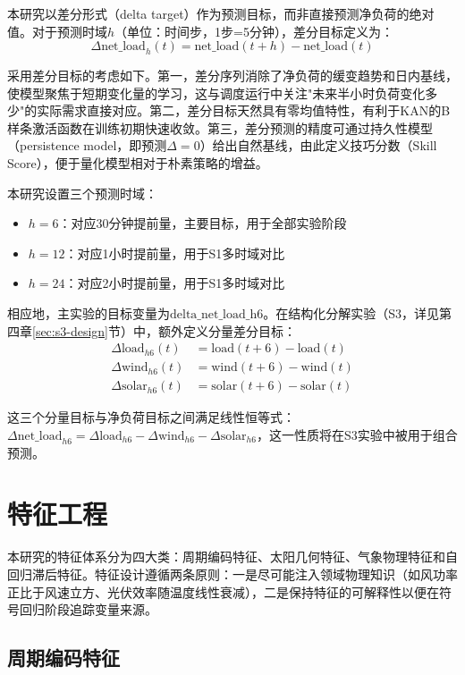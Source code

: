 本研究以差分形式（delta target）作为预测目标，而非直接预测净负荷的绝对值。对于预测时域$h$（单位：时间步，1步=5分钟），差分目标定义为：
\begin{equation}
\Delta\text{net\_load}_{h}(t) = \text{net\_load}(t+h) - \text{net\_load}(t)
\end{equation}

采用差分目标的考虑如下。第一，差分序列消除了净负荷的缓变趋势和日内基线，使模型聚焦于短期变化量的学习，这与调度运行中关注"未来半小时负荷变化多少"的实际需求直接对应。第二，差分目标天然具有零均值特性，有利于KAN的B样条激活函数在训练初期快速收敛。第三，差分预测的精度可通过持久性模型（persistence model，即预测$\Delta = 0$）给出自然基线，由此定义技巧分数（Skill Score），便于量化模型相对于朴素策略的增益。

本研究设置三个预测时域：
\begin{itemize}
  \item $h=6$：对应30分钟提前量，主要目标，用于全部实验阶段
  \item $h=12$：对应1小时提前量，用于S1多时域对比
  \item $h=24$：对应2小时提前量，用于S1多时域对比
\end{itemize}

相应地，主实验的目标变量为$\text{delta\_net\_load\_h6}$。在结构化分解实验（S3，详见第四章\ref{sec:s3-design}节）中，额外定义分量差分目标：
\begin{align}
\Delta\text{load}_{h6}(t) &= \text{load}(t+6) - \text{load}(t) \\
\Delta\text{wind}_{h6}(t) &= \text{wind}(t+6) - \text{wind}(t) \\
\Delta\text{solar}_{h6}(t) &= \text{solar}(t+6) - \text{solar}(t)
\end{align}

这三个分量目标与净负荷目标之间满足线性恒等式：$\Delta\text{net\_load}_{h6} = \Delta\text{load}_{h6} - \Delta\text{wind}_{h6} - \Delta\text{solar}_{h6}$，这一性质将在S3实验中被用于组合预测。

\section{特征工程}

本研究的特征体系分为四大类：周期编码特征、太阳几何特征、气象物理特征和自回归滞后特征。特征设计遵循两条原则：一是尽可能注入领域物理知识（如风功率正比于风速立方、光伏效率随温度线性衰减），二是保持特征的可解释性以便在符号回归阶段追踪变量来源。

\subsection{周期编码特征}

